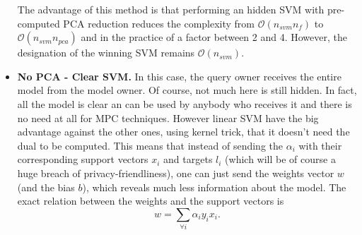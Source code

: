 \begin{itemize}
    The advantage of this method is that performing an hidden SVM with pre-computed PCA reduction reduces the complexity from $\mathcal{O}(n_{svm}n_f)$ to $\mathcal{O}(n_{svm}n_{pca})$ and in the practice of a factor between 2 and 4. However, the designation of the winning SVM remains $\mathcal{O}(n_{svm})$.
    
    \item \textbf{No PCA - Clear SVM.} In this case, the query owner receives the entire model from the model owner. Of course, not much here is still hidden. In fact, all the model is clear an can be used by anybody who receives it and there is no need at all for MPC techniques. However linear SVM have the big advantage against the other ones, using kernel trick, that it doesn't need the dual to be computed. This means that instead of sending the $\alpha_i$ with their corresponding support vectors $x_i$ and targets $l_i$ (which will be of course a huge breach of privacy-friendliness), one can just send the weights vector $w$ (and the bias $b$), which reveals much less information about the model. The exact relation between the weights and the support vectors is 
    \begin{equation}
        w = \sum_{\forall i}\alpha_i y_i x_i.
    \end{equation}
    

\end{itemize}
